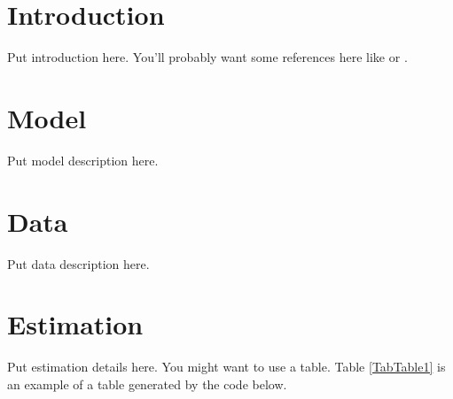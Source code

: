 \documentclass[letterpaper,12pt]{article}
\theoremstyle{definition}
\begin{document}
\begin{spacing}{1.5}{}

\section{Introduction}\label{SecIntro}

  Put introduction here. You'll probably want some references here like \citet{Auerbach:1996} or \citet{DEPR2015}.


\section{Model}\label{SecModel}

  Put model description here.


\section{Data}\label{SecData}

  Put data description here.


\section{Estimation}\label{SecEstimation}

  Put estimation details here. You might want to use a table. Table \ref{TabTable1} is an example of a table generated by the code below.


\end{spacing}
\end{document}
